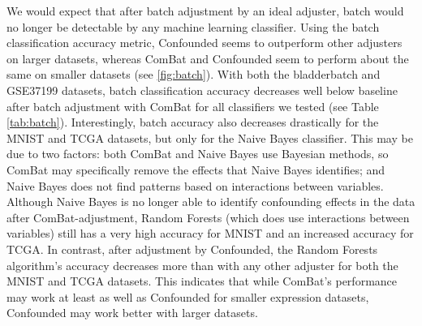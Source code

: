\documentclass[12pt]{article}
\begin{document}
We would expect that after batch adjustment by an ideal adjuster, batch would no longer be detectable by any machine learning classifier.
Using the batch classification accuracy metric, Confounded seems to outperform other adjusters on larger datasets, whereas ComBat and Confounded seem to perform about the same on smaller datasets (see \figurename{} \ref{fig:batch}).
With both the bladderbatch and GSE37199 datasets, batch classification accuracy decreases well below baseline after batch adjustment with ComBat for all classifiers we tested (see Table \ref{tab:batch}).
Interestingly, batch accuracy also decreases drastically for the MNIST and TCGA datasets, but only for the Naive Bayes classifier.
This may be due to two factors: both ComBat and Naive Bayes use Bayesian methods, so ComBat may specifically remove the effects that Naive Bayes identifies; and Naive Bayes does not find patterns based on interactions between variables.
Although Naive Bayes is no longer able to identify confounding effects in the data after ComBat-adjustment, Random Forests (which does use interactions between variables) still has a very high accuracy for MNIST and an increased accuracy for TCGA.
In contrast, after adjustment by Confounded, the Random Forests algorithm's accuracy decreases more than with any other adjuster for both the MNIST and TCGA datasets.
This indicates that while ComBat's performance may work at least as well as Confounded for smaller expression datasets, Confounded may work better with larger datasets.
\end{document}
